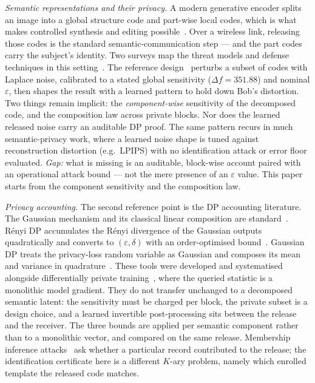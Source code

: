 \documentclass{ieeetj}
\theoremstyle{plain}
\theoremstyle{definition}
\begin{document}
\emph{Semantic representations and their privacy.} A modern generative encoder splits an image into a global structure code and
part-wise local codes, which is what makes controlled synthesis and editing
possible~\cite{semanticstylegan}. Over a wireless link, releasing those codes is the standard
semantic-communication step --- and the part codes carry the subject's identity. Two
surveys map the threat models and defense techniques in this setting~\cite{semcomsurvey_won,semcomsurvey_meng}. The reference
design~\cite{arXiv2510} perturbs a subset of codes with Laplace noise, calibrated to a stated global
sensitivity ($\Delta f=351.88$) and nominal $\varepsilon$, then shapes the result with a learned pattern to hold
down Bob's distortion. Two things remain implicit: the \emph{component-wise} sensitivity of the decomposed
code, and the composition law across private blocks. Nor does the learned released noise
carry an auditable DP proof. The same pattern recurs in much semantic-privacy work,
where a learned noise shape is tuned against reconstruction distortion (e.g.\ LPIPS)
with no identification attack or error floor evaluated. \emph{Gap:} what is missing is an
auditable, block-wise account paired with an operational attack bound --- not the mere
presence of an $\varepsilon$ value. This paper starts from the component sensitivity and the
composition law.

\emph{Privacy accounting.} The second reference point is the DP accounting
literature. The Gaussian mechanism and its classical linear
composition are standard~\cite{dwork2014}. R\'enyi DP accumulates the
R\'enyi divergence of the Gaussian outputs quadratically and converts to
$(\varepsilon,\delta)$ with an order-optimised bound~\cite{mironov2017rdp}.
Gaussian DP treats the privacy-loss random variable as Gaussian and composes
its mean and variance in quadrature~\cite{dong2022gdp}. These tools were
developed and systematised alongside differentially private
training~\cite{abadi2016}, where the queried statistic is a monolithic model
gradient. They do not transfer unchanged to a decomposed semantic latent: the
sensitivity must be charged per block, the private subset is a design choice,
and a learned invertible post-processing sits between the release and the
receiver. The three bounds are applied per semantic component rather than to a
monolithic vector, and compared on the same release. Membership inference
attacks~\cite{shokri2017} ask whether a particular record contributed to the
release; the identification certificate here is a different $K$-ary problem,
namely which enrolled template the released code matches.
\end{document}
